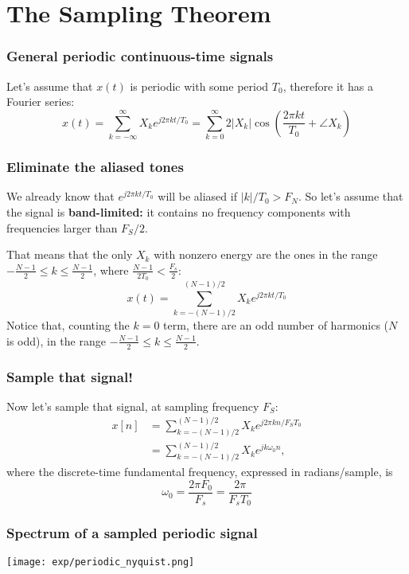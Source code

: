 \documentclass{beamer}
\begin{document}
\section[Sampling Theorem]{The Sampling Theorem}
\setcounter{subsection}{1}

\begin{frame}
  \frametitle{General periodic continuous-time signals}

  Let's assume that $x(t)$ is periodic with some period $T_0$,
  therefore it has a Fourier series:
  \[
  x(t) = \sum_{k=-\infty}^\infty X_k e^{j2\pi kt/T_0}
  = \sum_{k=0}^\infty 2|X_k|\cos\left(\frac{2\pi kt}{T_0}+\angle X_k\right)
  \]
\end{frame}

\begin{frame}
  \frametitle{Eliminate the aliased tones}

  We already know that $e^{j2\pi kt/T_0}$ will be aliased if $|k|/T_0 >
  F_N$.  So let's assume that the signal is {\bf band-limited:} it
  contains no frequency components with frequencies larger than $F_S/2$.

  That means that the only $X_k$ with nonzero energy are the ones in
  the range $-\frac{N-1}{2}\le k\le \frac{N-1}{2}$, where
  $\frac{N-1}{2T_0}<\frac{F_s}{2}$:
  \[
  x(t) = \sum_{k=-(N-1)/2}^{(N-1)/2} X_k e^{j2\pi kt/T_0}
  \]
  Notice that, counting the $k=0$ term, there are an odd number of
  harmonics ($N$ is odd), in the range $-\frac{N-1}{2}\le k\le
  \frac{N-1}{2}$.
\end{frame}

\begin{frame}
  \frametitle{Sample that signal!}

  Now let's sample that signal, at sampling frequency $F_S$:
  \begin{align*}
    x[n] &= \sum_{k=-(N-1)/2}^{(N-1)/2} X_k e^{j2\pi k n/F_ST_0}\\
    &= \sum_{k=-(N-1)/2}^{(N-1)/2} X_k e^{jk \omega_0 n},
  \end{align*}
  where the discrete-time fundamental frequency, expressed in radians/sample, is
  \begin{displaymath}
    \omega_0 = \frac{2\pi F_0}{F_s} = \frac{2\pi}{F_sT_0}
  \end{displaymath}
\end{frame}

\begin{frame}
  \frametitle{Spectrum of a sampled periodic signal}


  \centerline{\texttt{[image: exp/periodic\_nyquist.png]}}
\end{frame}
\end{document}
